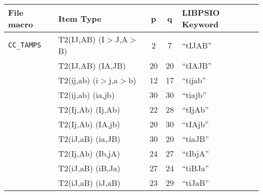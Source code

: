 \documentclass[12pt]{revtex4}
\begin{document}
\begin{table}
\squeezetable
\begin{center}
\renewcommand{\arraystretch}{0.95}
\begin{tabular}{llccl}
File macro & Item Type & p & q & LIBPSIO Keyword \\
\hline
{\tt CC\_TAMPS} & T2(IJ,AB) (I$>$J,A$>$B) & 2 & 7 & ``tIJAB'' \\
                & T2(IJ,AB) (IA,JB) & 20 & 20 & ``tIAJB'' \\
                & T2(ij,ab) (i$>$j,a$>$b) & 12 & 17 & ``tijab'' \\
                & T2(ij,ab) (ia,jb) & 30 & 30 & ``tiajb'' \\
                & T2(Ij,Ab) (Ij,Ab) & 22 & 28 & ``tIjAb'' \\
                & T2(Ij,Ab) (IA,jb) & 20 & 30 & ``tIAjb'' \\
                & T2(iJ,aB) (ia,JB) & 30 & 20 & ``tiaJB'' \\
                & T2(Ij,Ab) (Ib,jA) & 24 & 27 & ``tIbjA'' \\
                & T2(iJ,aB) (iB,Ja) & 27 & 24 & ``tiBJa'' \\
                & T2(iJ,aB) (iJ,aB) & 23 & 29 & ``tiJaB'' \\
\end{tabular}
\end{center}
\end{table}
\end{document}
